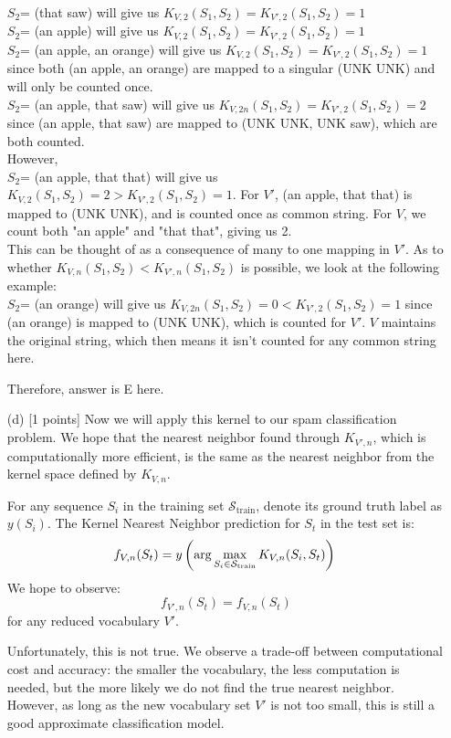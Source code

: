 \documentclass{article}
\begin{document}
\begin{itemize}
{ $S_2$= (that saw) will give us $K_{V, 2}(S_1, S_2) = K_{V', 2}(S_1, S_2) = 1$\\
 $S_2$= (an apple) will give us $K_{V, 2}(S_1, S_2) = K_{V', 2}(S_1, S_2) = 1$\\
 $S_2$= (an apple, an orange) will give us $K_{V, 2}(S_1, S_2) = K_{V',2}(S_1, S_2) = 1$ since both (an apple, an orange) are mapped to a singular (UNK UNK) and will only be counted once. \\
 $S_2$= (an apple, that saw) will give us $K_{V,2n}(S_1, S_2) = K_{V', 2}(S_1, S_2) = 2$ since (an apple, that saw) are mapped to (UNK UNK, UNK saw), which are both counted.\\
However, \\
$S_2$= (an apple, that that) will give us $K_{V, 2}(S_1, S_2) =2 > K_{V', 2}(S_1, S_2) = 1$. For $V'$, (an apple, that that) is mapped to (UNK UNK), and is counted once as common string. For $V$, we count both "an apple" and "that that", giving us 2.\\
This can be thought of as a consequence of many to one mapping in $V'$. As to whether $K_{V, n}(S_1, S_2) < K_{V', n}(S_1, S_2)$ is possible, we look at the following example:\\
 $S_2$= (an orange) will give us $K_{V,2n}(S_1, S_2) = 0 < K_{V', 2}(S_1, S_2) = 1$ since (an orange) is mapped to (UNK UNK), which is counted for $V'$. $V$ maintains the original string, which then means it isn't counted for any common string here.

Therefore, answer is E here.


    }
    
    \item[(d)] [1 points] Now we will apply this kernel to our spam classification problem. We hope that the nearest neighbor found through $K_{V', n}$, which is computationally more efficient, is the same as the nearest neighbor from the kernel space defined by $K_{V, n}$. 
    
    For any sequence $S_i$ in the training set $\mathcal{S}_{\text{train}}$, denote its ground truth label as $y(S_i)$. The Kernel Nearest Neighbor prediction for $S_t$ in the test set is:
    \[
        f_{V, n}(S_t) = y\left(\text{arg} \max_{S_i \in \mathcal{S}_{\text{train}}}  K_{V, n}(S_i, S_t)\right)\\
    \]
    We hope to observe:
    \[
        f_{V', n}(S_t) = f_{V, n}(S_t)  \tag{$\ast$} \label{eq:star}
    \]
    for any reduced vocabulary $V'$.
    
    Unfortunately, this is not true. We observe a trade-off between computational cost and accuracy: the smaller the vocabulary, the less computation is needed, but the more likely we do not find the true nearest neighbor. However, as long as the new vocabulary set $V'$ is not too small, this is still a good approximate classification model. 
    

\end{itemize}
\end{document}

